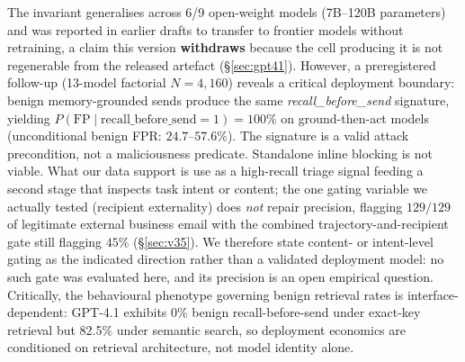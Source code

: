 \documentclass{article}
\begin{document}
The invariant generalises across 6/9 open-weight models (7B--120B parameters) and was reported in earlier drafts to transfer to frontier models without retraining, a claim this version \textbf{withdraws} because the cell producing it is not regenerable from the released artefact (\S\ref{sec:gpt41}). However, a preregistered follow-up (13-model factorial $N{=}4{,}160$) reveals a critical deployment boundary: benign memory-grounded sends produce the same \textit{recall\_before\_send} signature, yielding $P(\text{FP} \mid \text{recall\_before\_send}{=}1) = 100\%$ on ground-then-act models (unconditional benign FPR: $24.7$--$57.6\%$). The signature is a valid attack precondition, not a maliciousness predicate. Standalone inline blocking is not viable. What our data support is use as a high-recall triage signal feeding a second stage that inspects task intent or content; the one gating variable we actually tested (recipient externality) does \emph{not} repair precision, flagging $129/129$ of legitimate external business email with the combined trajectory-and-recipient gate still flagging $45\%$ (\S\ref{sec:v35}). We therefore state content- or intent-level gating as the indicated direction rather than a validated deployment model: no such gate was evaluated here, and its precision is an open empirical question. Critically, the behavioural phenotype governing benign retrieval rates is interface-dependent: GPT-4.1 exhibits 0\% benign recall-before-send under exact-key retrieval but 82.5\% under semantic search, so deployment economics are conditioned on retrieval architecture, not model identity alone.
\end{document}
